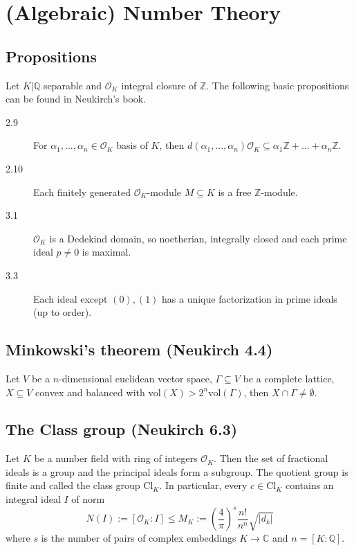 \documentclass{scrartcl}
\newcommand{\Z}{\mathbb{Z}}
\newcommand{\Q}{\mathbb{Q}}
\begin{document}
\section{(Algebraic) Number Theory}

\subsection{Propositions}
Let $K|\Q$ separable and $\mathcal{O}_K$ integral closure of $\Z$. The following basic propositions can be found in Neukirch's book.
\begin{description}
    \item[2.9] For $\alpha_1, ..., \alpha_n \in \mathcal{O}_K$ basis of $K$, then $d(\alpha_1, ..., \alpha_n)\mathcal{O}_K \subseteq \alpha_1 \Z + ... + \alpha_n \Z$.
    \item[2.10] Each finitely generated $\mathcal{O}_K$-module $M \subseteq K$ is a free $\Z$-module. 
    \item[3.1] $\mathcal{O}_K$ is a Dedekind domain, so noetherian, integrally closed and each prime ideal $p \neq 0$ is maximal.
    \item[3.3] Each ideal except $(0), (1)$ has a unique factorization in prime ideals (up to order). 
\end{description}

\subsection{Minkowski's theorem (Neukirch 4.4)}
Let $V$ be a $n$-dimensional euclidean vector space, $\Gamma \subseteq V$ be a complete lattice, $X \subseteq V$ convex and balanced with $\mathrm{vol}(X) > 2^n \mathrm{vol}(\Gamma)$, then $X \cap \Gamma \neq \emptyset$.

\subsection{The Class group (Neukirch 6.3)}
Let $K$ be a number field with ring of integers $\mathcal{O}_K$. Then the set of fractional ideals is a group and the principal ideals form a subgroup. The quotient group is finite and called the class group $\mathrm{Cl}_K$. In particular, every $c \in \mathrm{Cl}_K$ contains an integral ideal $I$ of norm
\begin{equation*}
    N(I) := [ \mathcal{O}_K : I ] \leq M_K := \left( \frac 4 \pi \right)^s \frac {n!} {n^n} \sqrt{|d_k|}
\end{equation*}
where $s$ is the number of pairs of complex embeddings $K \to \mathbb{C}$ and $n = [K : \Q]$.
\end{document}
